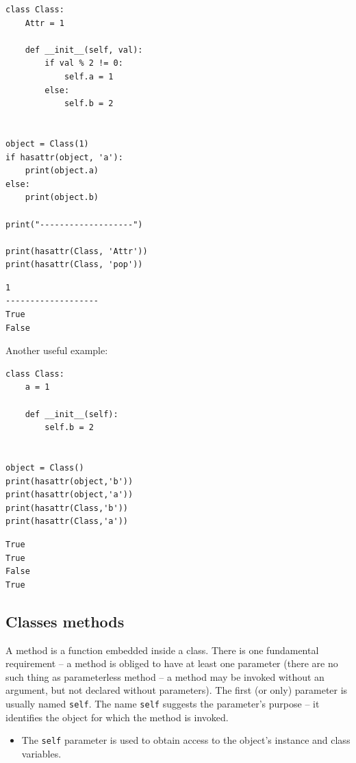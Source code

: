 \documentclass[11pt]{article}
\begin{document}
\begin{verbatim}
class Class:
	Attr = 1

	def __init__(self, val):
		if val % 2 != 0:
			self.a = 1
		else:
			self.b = 2


object = Class(1)
if hasattr(object, 'a'):
	print(object.a)
else:
	print(object.b)

print("-------------------")

print(hasattr(Class, 'Attr'))
print(hasattr(Class, 'pop'))

\end{verbatim}

\begin{verbatim}
1
-------------------
True
False
\end{verbatim}

\break
\newline

Another useful example:

\begin{verbatim}
class Class:
	a = 1

	def __init__(self):
		self.b = 2


object = Class()
print(hasattr(object,'b'))
print(hasattr(object,'a'))
print(hasattr(Class,'b'))
print(hasattr(Class,'a'))

\end{verbatim}

\begin{verbatim}
True
True
False
True
\end{verbatim}
\newpage

\subsection{Classes methods}
\label{sec:org3a7deb9}
A method is a function embedded inside a class. There is one
fundamental requirement – a method is obliged to have at least one
parameter (there are no such thing as parameterless method – a method
may be invoked without an argument, but not declared without
parameters). The first (or only) parameter is usually named
\texttt{self}. The name \texttt{self} suggests the parameter’s purpose – it
identifies the object for which the method is invoked. 

\begin{itemize}
\item The \texttt{self} parameter is used to obtain access to the object’s
instance and class variables.
\end{itemize}
\end{document}
